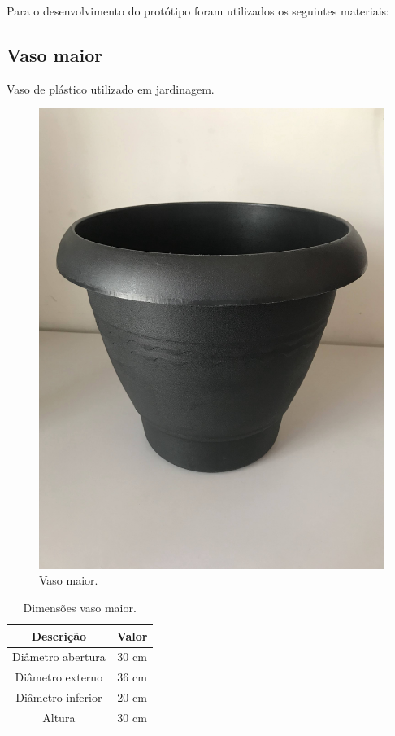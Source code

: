 \documentclass[
	12pt,				%
	openright,			%
	oneside,			%
	a4paper,			%
	chapter=TITLE,		%
	english,			%
	brazil				%
	]{abntex2}
\begin{document}
Para o desenvolvimento do protótipo foram utilizados os seguintes materiais:

\subsection{Vaso maior}

Vaso de plástico utilizado em jardinagem.

\begin{multicols}{2}
\begin{figure}[H]
    \centering
    \includegraphics[scale=0.04, angle=-90]{imagens/IMG_0598.jpg}
    \caption{Vaso maior.}
    \label{fig:vasomaior}
\end{figure} 
 
\begin{table}[H]
    \centering
    \caption{Dimensões vaso maior.}
    \label{tab:vasomaior} 
    \begin{tabular}{ |c|c| }                           
        \hline
        \rowcolor{lightgray} \textbf{Descrição} & \textbf{Valor}\\
        \hline
        Diâmetro abertura & 30 cm \\
        \hline
        Diâmetro externo & 36 cm \\
        \hline
        Diâmetro inferior & 20 cm \\
        \hline
        Altura & 30 cm \\
        \hline
    \end{tabular}  
\end{table}    
\end{multicols}
\end{document}
